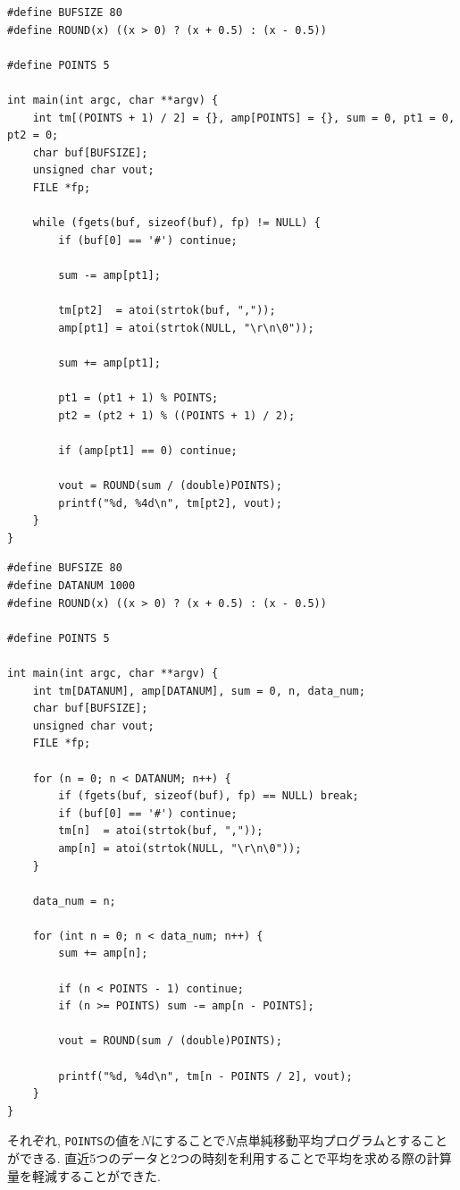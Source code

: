 \documentclass[titlepage]{jsarticle}
\begin{document}
        \begin{lstlisting}[caption=mvave5-1.c, label=src:mvave5-1]
#define BUFSIZE 80
#define ROUND(x) ((x > 0) ? (x + 0.5) : (x - 0.5))

#define POINTS 5

int main(int argc, char **argv) {
    int tm[(POINTS + 1) / 2] = {}, amp[POINTS] = {}, sum = 0, pt1 = 0, pt2 = 0;
    char buf[BUFSIZE];
    unsigned char vout;
    FILE *fp;

    while (fgets(buf, sizeof(buf), fp) != NULL) {
        if (buf[0] == '#') continue;

        sum -= amp[pt1];
        
        tm[pt2]  = atoi(strtok(buf, ","));
        amp[pt1] = atoi(strtok(NULL, "\r\n\0"));

        sum += amp[pt1];

        pt1 = (pt1 + 1) % POINTS;
        pt2 = (pt2 + 1) % ((POINTS + 1) / 2);

        if (amp[pt1] == 0) continue;

        vout = ROUND(sum / (double)POINTS);
        printf("%d, %4d\n", tm[pt2], vout);
    }
}\end{lstlisting}

        \begin{lstlisting}[caption=mvave5-2.c, label=src:mvave5-2]
#define BUFSIZE 80
#define DATANUM 1000
#define ROUND(x) ((x > 0) ? (x + 0.5) : (x - 0.5))

#define POINTS 5

int main(int argc, char **argv) {
    int tm[DATANUM], amp[DATANUM], sum = 0, n, data_num;
    char buf[BUFSIZE];
    unsigned char vout;
    FILE *fp;

    for (n = 0; n < DATANUM; n++) {
        if (fgets(buf, sizeof(buf), fp) == NULL) break;
        if (buf[0] == '#') continue;
        tm[n]  = atoi(strtok(buf, ","));
        amp[n] = atoi(strtok(NULL, "\r\n\0"));
    }

    data_num = n;

    for (int n = 0; n < data_num; n++) {
        sum += amp[n];

        if (n < POINTS - 1) continue;
        if (n >= POINTS) sum -= amp[n - POINTS];

        vout = ROUND(sum / (double)POINTS);

        printf("%d, %4d\n", tm[n - POINTS / 2], vout);
    }
}\end{lstlisting}

        それぞれ, \verb|POINTS|の値を$N$にすることで$N$点単純移動平均プログラムとすることができる.
        直近5つのデータと2つの時刻を利用することで平均を求める際の計算量を軽減することができた.
\end{document}
